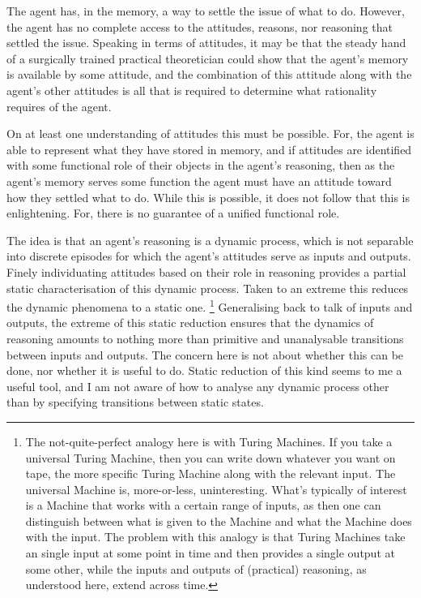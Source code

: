 \documentclass[10pt]{article}
\begin{document}
The agent has, in the memory, a way to settle the issue of what to do.
However, the agent has no complete access to the attitudes, reasons, nor reasoning that settled the issue.
Speaking in terms of attitudes, it may be that the steady hand of a surgically trained practical theoretician could show that the agent's memory is available by some attitude, and the combination of this attitude along with the agent's other attitudes is all that is required to determine what rationality requires of the agent.

On at least one understanding of attitudes this must be possible.
For, the agent is able to represent what they have stored in memory, and if attitudes are identified with some functional role of their objects in the agent's reasoning, then as the agent's memory serves some function the agent must have an attitude toward how they settled what to do.
While this is possible, it does not follow that this is enlightening.
For, there is no guarantee of a unified functional role.

The idea is that an agent's reasoning is a dynamic process, which is not separable into discrete episodes for which the agent's attitudes serve as inputs and outputs.
Finely individuating attitudes based on their role in reasoning provides a partial static characterisation of this dynamic process.
Taken to an extreme this reduces the dynamic phenomena to a static one.\nolinebreak
\footnote{The not-quite-perfect analogy here is with Turing Machines.
  If you take a universal Turing Machine, then you can write down whatever you want on tape, the more specific Turing Machine along with the relevant input.
  The universal Machine is, more-or-less, uninteresting.
  What's typically of interest is a Machine that works with a certain range of inputs, as then one can distinguish between what is given to the Machine and what the Machine does with the input.
The problem with this analogy is that Turing Machines take an single input at some point in time and then provides a single output at some other, while the inputs and outputs of (practical) reasoning, as understood here, extend across time.}
Generalising back to talk of inputs and outputs, the extreme of this static reduction ensures that the dynamics of reasoning amounts to nothing more than primitive and unanalysable transitions between inputs and outputs.
The concern here is not about whether this can be done, nor whether it is useful to do.
Static reduction of this kind seems to me a useful tool, and I am not aware of how to analyse any dynamic process other than by specifying transitions between static states.
\end{document}
